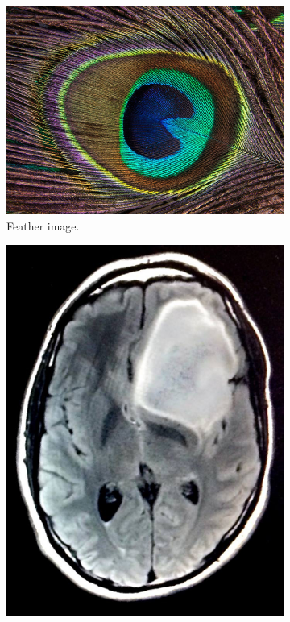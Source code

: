 \documentclass[abstracton]{scrreprt}
\begin{document}
\begin{figure}[!ht]
                \begin{subfigure}[b]{0.245\textwidth}
                    \includegraphics[width=\textwidth]{img/images/peacock-feather.png}
                    \caption{Feather image.}
                \end{subfigure}
                \begin{subfigure}[b]{0.25\textwidth}
                    \includegraphics[width=\textwidth]{img/images/keating.jpg}

\end{subfigure}
\end{figure}
\end{document}
